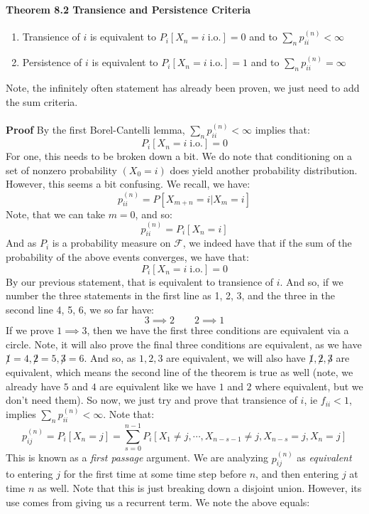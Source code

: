 \documentclass[12pt,a4paper]{article}
\newcommand{\1}[1]{\mathbbm{1}\left\{ #1 \right\}}
\newcommand{\fcal}{\mathcal{F}}
\newcommand{\io}{\text{i.o.}}
\begin{document}
\paragraph{Theorem 8.2 Transience and Persistence Criteria}
\begin{enumerate}
	\item Transience of $i$ is equivalent to $P_i\left[X_n = i \;\io\right] = 0$ and to $\sum_n p_{ii}^{(n)} < \infty$
	\item Persistence of $i$ is equivalent to $P_i\left[X_n = i \;\io\right] = 1$ and to $\sum_n p_{ii}^{(n)} = \infty$
\end{enumerate}
Note, the infinitely often statement has already been proven, we just need to add the sum criteria.
\\\\
\textbf{Proof} By the first Borel-Cantelli lemma, $\sum_n p_{ii}^{(n)} < \infty$ implies that:
$$
	P_i\left[X_n = i \;\io\right] = 0
$$
For one, this needs to be broken down a bit. We do note that conditioning on a set of nonzero probability $(X_0 = i)$ does yield another probability distribution. However, this seems a bit confusing. We recall, we have:
$$
	p_{ii}^{(n)} = P\left[X_{m+n} = i|X_m = i\right]
$$
Note, that we can take $m = 0$, and so:
$$
	p_{ii}^{(n)} = P_i\left[X_n = i\right]
$$
And as $P_i$ is a probability measure on $\fcal$, we indeed have that if the sum of the probability of the above events converges, we have that:
$$
	P_i\left[X_n = i \;\io\right] = 0
$$
By our previous statement, that is equivalent to transience of $i$. And so, if we number the three statements in the first line as 1, 2, 3, and the three in the second line 4, 5, 6, we so far have:
$$
	3 \implies 2 \quad\quad 2 \implies 1
$$
If we prove $1 \implies 3$, then we have the first three conditions are equivalent via a circle. Note, it will also prove the final three conditions are equivalent, as we have $\not 1 = 4, \not 2 = 5, \not 3 = 6$. And so, as $1, 2, 3$ are equivalent, we will also have $\not 1, \not 2, \not 3$ are equivalent, which means the second line of the theorem is true as well (note, we already have $5$ and $4$ are equivalent like we have $1$ and $2$ where equivalent, but we don't need them). So now, we just try and prove that transience of $i$, ie $f_{ii} < 1$, implies $\sum_n p_{ii}^{(n)} < \infty$. Note that:
$$
	p_{ij}^{(n)} = P_i\left[X_n = j\right] =
	\sum_{s = 0}^{n-1} P_i\left[X_1 \neq j, \cdots, X_{n - s - 1} \neq j, X_{n - s} = j, X_n = j\right]
$$
This is known as a \textit{first passage} argument. We are analyzing $p_{ij}^{(n)}$ as \textit{equivalent} to entering $j$ for the first time at some time step before $n$, and then entering $j$ at time $n$ as well. Note that this is just breaking down a disjoint union. However, its use comes from giving us a recurrent term. We note the above equals:
\end{document}

